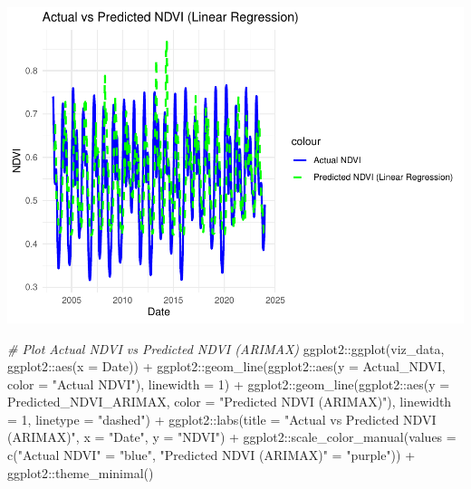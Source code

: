 \documentclass[
]{article}
\newenvironment{Shaded}{}{}
\newcommand{\AttributeTok}[1]{\textcolor[rgb]{0.49,0.56,0.16}{#1}}
\newcommand{\CommentTok}[1]{\textcolor[rgb]{0.38,0.63,0.69}{\textit{#1}}}
\newcommand{\DecValTok}[1]{\textcolor[rgb]{0.25,0.63,0.44}{#1}}
\newcommand{\FunctionTok}[1]{\textcolor[rgb]{0.02,0.16,0.49}{#1}}
\newcommand{\NormalTok}[1]{#1}
\newcommand{\OtherTok}[1]{\textcolor[rgb]{0.00,0.44,0.13}{#1}}
\newcommand{\SpecialCharTok}[1]{\textcolor[rgb]{0.25,0.44,0.63}{#1}}
\newcommand{\StringTok}[1]{\textcolor[rgb]{0.25,0.44,0.63}{#1}}
\begin{document}
\begin{center}\includegraphics{BI_VegetationResponse_Project_HarvardX_Ph125_9x_files/figure-latex/vis_predictions-2} \end{center}

\begin{Shaded}
\begin{Highlighting}[]
\CommentTok{\# Plot Actual NDVI vs Predicted NDVI (ARIMAX)}
\NormalTok{ggplot2}\SpecialCharTok{::}\FunctionTok{ggplot}\NormalTok{(viz\_data, ggplot2}\SpecialCharTok{::}\FunctionTok{aes}\NormalTok{(}\AttributeTok{x =}\NormalTok{ Date)) }\SpecialCharTok{+}
\NormalTok{  ggplot2}\SpecialCharTok{::}\FunctionTok{geom\_line}\NormalTok{(ggplot2}\SpecialCharTok{::}\FunctionTok{aes}\NormalTok{(}\AttributeTok{y =}\NormalTok{ Actual\_NDVI, }
                                  \AttributeTok{color =} \StringTok{"Actual NDVI"}\NormalTok{), }\AttributeTok{linewidth =} \DecValTok{1}\NormalTok{) }\SpecialCharTok{+}
\NormalTok{  ggplot2}\SpecialCharTok{::}\FunctionTok{geom\_line}\NormalTok{(ggplot2}\SpecialCharTok{::}\FunctionTok{aes}\NormalTok{(}\AttributeTok{y =}\NormalTok{ Predicted\_NDVI\_ARIMAX, }
                                  \AttributeTok{color =} \StringTok{"Predicted NDVI (ARIMAX)"}\NormalTok{), }
                     \AttributeTok{linewidth =} \DecValTok{1}\NormalTok{, }\AttributeTok{linetype =} \StringTok{"dashed"}\NormalTok{) }\SpecialCharTok{+}
\NormalTok{  ggplot2}\SpecialCharTok{::}\FunctionTok{labs}\NormalTok{(}\AttributeTok{title =} \StringTok{"Actual vs Predicted NDVI (ARIMAX)"}\NormalTok{,}
                \AttributeTok{x =} \StringTok{"Date"}\NormalTok{, }\AttributeTok{y =} \StringTok{"NDVI"}\NormalTok{) }\SpecialCharTok{+}
\NormalTok{  ggplot2}\SpecialCharTok{::}\FunctionTok{scale\_color\_manual}\NormalTok{(}\AttributeTok{values =} \FunctionTok{c}\NormalTok{(}\StringTok{"Actual NDVI"} \OtherTok{=} \StringTok{"blue"}\NormalTok{, }
                                         \StringTok{"Predicted NDVI (ARIMAX)"} \OtherTok{=} \StringTok{"purple"}\NormalTok{)) }\SpecialCharTok{+}
\NormalTok{  ggplot2}\SpecialCharTok{::}\FunctionTok{theme\_minimal}\NormalTok{()}
\end{Highlighting}
\end{Shaded}
\end{document}
